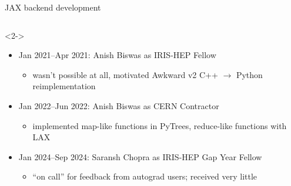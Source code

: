 \documentclass[aspectratio=169]{beamer}
\begin{document}
\begin{frame}{JAX backend development}
\large
\vspace{0.5 cm}
\begin{columns}
\end{columns}

\begin{uncoverenv}<2->
\begin{itemize}\setlength{\itemsep}{0.25 cm}
\item Jan 2021--Apr 2021: Anish Biswas as IRIS-HEP Fellow
\begin{itemize}
\item wasn't possible at all, motivated Awkward v2 C++ $\to$ Python reimplementation
\end{itemize}
\item Jan 2022--Jun 2022: Anish Biswas as CERN Contractor
\begin{itemize}
\item implemented map-like functions in PyTrees, reduce-like functions with LAX
\end{itemize}
\item Jan 2024--Sep 2024: Saransh Chopra as IRIS-HEP Gap Year Fellow
\begin{itemize}
\item ``on call'' for feedback from autograd users; received very little
\end{itemize}
\end{itemize}
\end{uncoverenv}
\end{frame}
\end{document}
